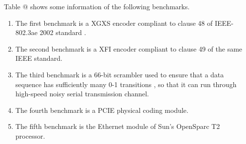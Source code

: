 \documentclass[journal]{IEEEtran}
\makeatletter
\newcommand{\Rmnum}[1]{\expandafter\@slowromancap\romannumeral #1@}
\makeatother
\begin{document}

Table \Rmnum{1} shows some information of the following benchmarks.
\begin{enumerate}
  \item The first benchmark is a XGXS encoder compliant to clause 48 of IEEE-802.3ae 2002 standard \cite{IEEE80232002}.
  \item The second benchmark is a XFI encoder compliant to clause 49 of the same IEEE standard.
  \item The third benchmark is a 66-bit scrambler used to ensure
that a data sequence has sufficiently many 0-1 transitions
, so that it can run through high-speed
noisy serial transmission channel.
  \item The fourth benchmark is a PCIE physical coding module.
  \item The fifth benchmark is the Ethernet module of Sun's OpenSparc T2 processor.
\end{enumerate}

\end{document}
